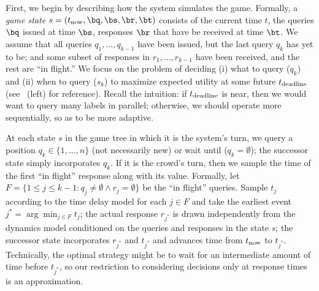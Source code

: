 
First, we begin by describing how the system simulates the game.
Formally, a \emph{game state} $s = (\now, \bq, \bs, \br, \bt)$
consists of the current time $t$, the queries $\bq$ issued at time $\bs$,
responses $\br$ that have be received at time $\bt$.
We assume that all queries $q_1, \dots, q_{k-1}$ have been issued,
but the last query $q_k$ has yet to be;
and some subset of responses in $r_1, \dots, r_{k-1}$ have been received,
and the rest are ``in flight.''
We focus on the problem of deciding (i) what to query ($q_k$)
and (ii) when to query ($s_k$) to maximize expected utility
at some future $t_\text{deadline}$ (see ~(left) for reference).
Recall the intuition: if $t_\text{deadline}$ is near, then we would want to query
many labels in parallel; otherwise, we should operate more sequentially,
so as to be more adaptive.

At each state $s$ in the game tree in which it is the system's turn,
we query a position $q_k \in \{1, \dots, n\}$ (not necessarily new)
or wait until ($q_k = \emptyset$);
the successor state simply incorporates $q_k$.
If it is the crowd's turn,
then we sample the time of the first ``in flight'' response along with its value.
Formally, let $F = \{ 1 \le j \le k-1 : q_j \neq \emptyset \wedge r_j = \emptyset \}$ be the ``in flight'' queries.
Sample $t_j$ according to the time delay model for each $j \in F$
and take the earliest event $j^* = \arg\min_{j \in F} t_j$;
the actual response $r_{j^*}$ is drawn independently from the dynamics model conditioned on the queries and responses
in the state $s$;
the successor state incorporates $r_{j^*}$ and $t_{j^*}$ and advances time from $t_\text{now}$ to $t_{j^*}$.
Technically, the optimal strategy might be to wait for an intermediate amount of time before $t_{j^*}$,
so our restriction to considering decisions only at response times is an approximation.

